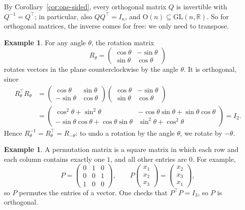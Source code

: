 \documentclass[11pt]{article}
\theoremstyle{definition}
\newtheorem{example}[definition]{Example}
\theoremstyle{plain}
\theoremstyle{remark}
\begin{document}
By Corollary~\ref{cor:one-sided}, every orthogonal matrix $Q$ is invertible with $Q^{-1} = Q^\top$; in particular, also $QQ^\top = I_n$, and $\mathrm{O}(n) \subseteq \mathrm{GL}(n, \mathbb{R})$. So for orthogonal matrices, the inverse comes for free: we only need to transpose.

\begin{example}
    For any angle $\theta$, the rotation matrix
    \[R_\theta = \begin{pmatrix}
        \cos\theta & -\sin\theta \\
        \sin\theta & \cos\theta
    \end{pmatrix}\]
    rotates vectors in the plane counterclockwise by the angle $\theta$. It is orthogonal, since
    \begin{align*}
        R_\theta^\top R_\theta &= \begin{pmatrix}
            \cos\theta & \sin\theta \\
            -\sin\theta & \cos\theta
        \end{pmatrix} \begin{pmatrix}
            \cos\theta & -\sin\theta \\
            \sin\theta & \cos\theta
        \end{pmatrix} \\
        &= \begin{pmatrix}
            \cos^2\theta + \sin^2\theta & -\cos\theta \sin\theta + \sin\theta \cos\theta \\
            -\sin\theta \cos\theta + \cos\theta \sin\theta & \sin^2\theta + \cos^2\theta
        \end{pmatrix} = I_2.
    \end{align*}
    Hence $R_\theta^{-1} = R_\theta^\top = R_{-\theta}$: to undo a rotation by the angle $\theta$, we rotate by $-\theta$.
\end{example}

\begin{example}
    A permutation matrix is a square matrix in which each row and each column contains exactly one $1$, and all other entries are $0$. For example,
    \[P = \begin{pmatrix}
        0 & 1 & 0 \\
        0 & 0 & 1 \\
        1 & 0 & 0
    \end{pmatrix}, \qquad P \begin{pmatrix}
        x_1 \\
        x_2 \\
        x_3
    \end{pmatrix} = \begin{pmatrix}
        x_2 \\
        x_3 \\
        x_1
    \end{pmatrix},\]
    so $P$ permutes the entries of a vector. One checks that $P^\top P = I_3$, so $P$ is orthogonal.
\end{example}
\end{document}
